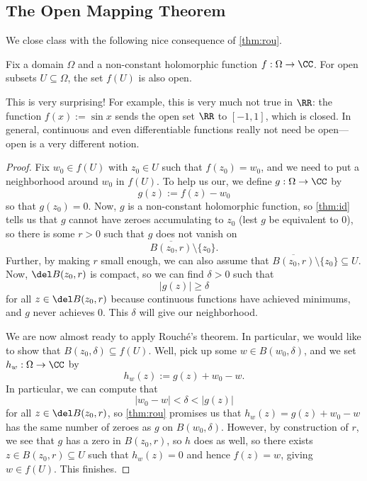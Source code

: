 \subsection{The Open Mapping Theorem}
We close class with the following nice consequence of \autoref{thm:rou}.
\begin{theorem} \label{thm:openmap}
	Fix a domain $\Omega$ and a non-constant holomorphic function $f:\Omega\to\CC$. For open subsets $U\subseteq\Omega$, the set $f(U)$ is also open.
\end{theorem}
This is very surprising! For example, this is very much not true in $\RR$: the function $f(x):=\sin x$ sends the open set $\RR$ to $[-1,1]$, which is closed. In general, continuous and even differentiable functions really not need be open---open is a very different notion.
\begin{proof}
	Fix $w_0\in f(U)$ with $z_0\in U$ such that $f(z_0)=w_0$, and we need to put a neighborhood around $w_0$ in $f(U)$. To help us our, we define $g:\Omega\to\CC$ by
	\[g(z):=f(z)-w_0\]
	so that $g(z_0)=0$. Now, $g$ is a non-constant holomorphic function, so \autoref{thm:id} tells us that $g$ cannot have zeroes accumulating to $z_0$ (lest $g$ be equivalent to $0$), so there is some $r>0$ such that $g$ does not vanish on
	\[\overline{B(z_0,r)}\setminus\{z_0\}.\]
	Further, by making $r$ small enough, we can also assume that $\overline{B(z_0,r)}\setminus\{z_0\}\subseteq U$. Now, $\del B(z_0,r)$ is compact, so we can find $\delta>0$ such that
	\[|g(z)|\ge\delta\]
	for all $z\in\del B(z_0,r)$ because continuous functions have achieved minimums, and $g$ never achieves $0$. This $\delta$ will give our neighborhood.

	We are now almost ready to apply Rouch\'e's theorem. In particular, we would like to show that $B(z_0,\delta)\subseteq f(U)$. Well, pick up some $w\in B(w_0,\delta)$, and we set $h_w:\Omega\to\CC$ by
	\[h_w(z):=g(z)+w_0-w.\]
	In particular, we can compute that
	\[|w_0-w|<\delta<|g(z)|\]
	for all $z\in\del B(z_0,r)$, so \autoref{thm:rou} promises us that $h_w(z)=g(z)+w_0-w$ has the same number of zeroes as $g$ on $B(w_0,\delta)$. However, by construction of $r$, we see that $g$ has a zero in $B(z_0,r)$, so $h$ does as well, so there exists $z\in B(z_0,r)\subseteq U$ such that $h_w(z)=0$ and hence $f(z)=w$, giving $w\in f(U)$. This finishes.
\end{proof}